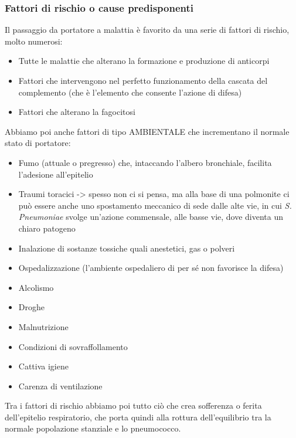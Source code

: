 \subsubsection{Fattori di rischio o cause predisponenti}

  Il passaggio da portatore a malattia è favorito da una serie di
  fattori di rischio, molto numerosi:

\begin{itemize}
\item
  Tutte le malattie che alterano la formazione e produzione di anticorpi
\item
  Fattori che intervengono nel perfetto funzionamento della cascata del
  complemento (che è l'elemento che consente l'azione di difesa)
\item
  Fattori che alterano la fagocitosi
\end{itemize}
  Abbiamo poi anche fattori di tipo AMBIENTALE che incrementano il
  normale stato di portatore:

\begin{itemize}
\item
  Fumo (attuale o pregresso) che, intaccando l'albero bronchiale,
  facilita l'adesione all'epitelio
\item
  Traumi toracici -> spesso non ci si pensa, ma alla base di una
  polmonite ci può essere anche uno spostamento meccanico di sede dalle
  alte vie, in cui \emph{S. Pneumoniae} svolge un'azione commensale,
  alle basse vie, dove diventa un chiaro patogeno
\item
  Inalazione di sostanze tossiche quali anestetici, gas o polveri
\item
  Ospedalizzazione (l'ambiente ospedaliero di per sé non favorisce la
  difesa)
\item
  Alcolismo
\item
  Droghe
\item
  Malnutrizione
\item
  Condizioni di sovraffollamento
\item
  Cattiva igiene
\item
  Carenza di ventilazione
\end{itemize}
  Tra i fattori di rischio abbiamo poi tutto ciò che crea sofferenza o
  ferita dell'epitelio respiratorio, che porta quindi alla rottura
  dell'equilibrio tra la normale popolazione stanziale e lo pneumococco.

